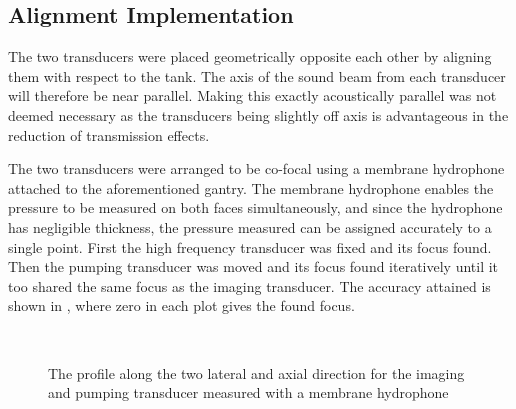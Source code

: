 \subsection{Alignment Implementation}


The two transducers were placed geometrically opposite each other by aligning them with respect to the tank.
The axis of the sound beam from each transducer will therefore be near parallel.
Making this exactly acoustically parallel was not deemed necessary
as the transducers being slightly off axis is advantageous in the reduction of transmission effects.

The two transducers were arranged to be co-focal using a membrane hydrophone attached to the aforementioned gantry. %
The membrane hydrophone  enables the pressure to be measured on both faces simultaneously, 
and since the hydrophone has negligible thickness,
the pressure measured can be assigned accurately to a single point.
First the high frequency transducer was fixed and its focus found.
Then the pumping transducer was moved and its focus found iteratively until it too shared the same focus as the imaging transducer.
The accuracy attained is shown in ,
where zero in each plot gives  the found focus.



\begin{centering}
\begin{figure}[h]%
   \\
   \vspace{.3in}
   \caption{
     The profile along the two lateral and axial direction for the imaging and pumping transducer measured with a membrane hydrophone
   }
   \label{fig:profiles}
\end{figure}
\end{centering}






